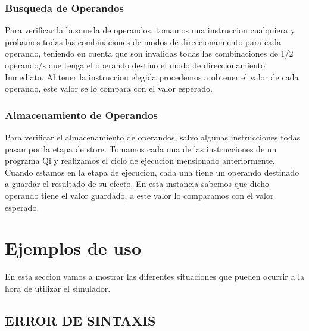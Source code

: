 \subsubsection{Busqueda de Operandos}

Para verificar la busqueda de operandos, tomamos una instruccion cualquiera y probamos todas las combinaciones de modos de direccionamiento para cada operando, teniendo en cuenta que son invalidas todas las combinaciones de 1/2 operando/s que tenga el operando destino el modo de direccionamiento Inmediato. Al tener la instruccion elegida procedemos a obtener el valor de cada operando, este valor se lo compara con el valor esperado. 
 
\subsubsection{Almacenamiento de Operandos}

Para verificar el almacenamiento de operandos, salvo algunas instrucciones todas pasan por la etapa de store.
Tomamos cada una de las instrucciones de un programa Qi y realizamos el ciclo de ejecucion mensionado anteriormente.
Cuando estamos en la etapa de ejecucion, cada una tiene un operando destinado a guardar el resultado de su efecto.
En esta instancia sabemos que  dicho operando tiene el valor guardado, a este valor lo comparamos con el valor esperado.

\section{Ejemplos de uso}

En esta seccion vamos a mostrar las diferentes situaciones que pueden ocurrir a la hora de utilizar el simulador.

\subsection{ERROR DE SINTAXIS} 


